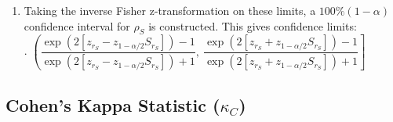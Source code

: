\begin{enumerate}
\begin{enumerate}
        \item Taking the inverse Fisher z-transformation on these limits, a $100\%(1 - \alpha)$ confidence interval for $\rho_S$ is constructed. This gives confidence limits:
        \hfill \cite{statistics/book/Statistics-for-Data-Scientists/Maurits-Kaptein}
        \\
        .\hfill
        $
            \left(
                \dfrac{\exp(2[z_{r_S} - z_{1-\alpha/2} S_{r_S} ]) - 1}{\exp(2[z_{r_S} - z_{1-\alpha/2} S_{r_S} ]) + 1},
                \ \dfrac{\exp(2[z_{r_S} + z_{1-\alpha/2} S_{r_S} ]) - 1}{\exp(2[z_{r_S} + z_{1-\alpha/2} S_{r_S} ]) + 1}
            \right]
        $
        \hfill \cite{statistics/book/Statistics-for-Data-Scientists/Maurits-Kaptein}
    \end{enumerate}
\end{enumerate}















\subsection{Cohen’s Kappa Statistic ($\kappa_C$)}


